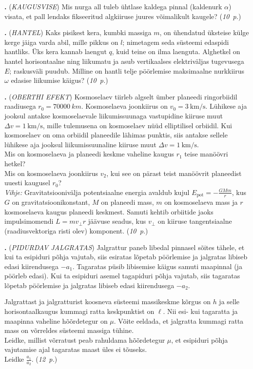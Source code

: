\documentclass[11pt,a5paper]{article}
\newcommand{\numb}[1]{\vspace{5pt}\textbf{\large #1}}
\newcommand{\nimi}[1]{(\textsl{\small #1})}
\newcommand{\punktid}[1]{(\emph{#1~p.})}
\newcounter{ylesanne}
\newcommand{\yl}[1]{\addtocounter{ylesanne}{1}\numb{\theylesanne.} \nimi{#1} \newblock{}}
\newcommand{\autor}[1]{}%
\begin{document}
\newpage
\yl{KAUGUSVISE} Mis nurga all tuleb ühtlase kaldega pinnal (kaldenurk $\alpha$) visata, et pall lendaks fikseeritud algkiiruse juures võimalikult kaugele?
\punktid{10} \autor{Jaan Kalda}

\yl{HANTEL} Kaks pisikest kera, kumbki massiga $m$, on ühendatud üksteise külge kerge jäiga varda abil, mille pikkus on $l$; nimetagem seda süsteemi edaspidi hantliks. Üks kera kannab laengut $q$, kuid teine on ilma laenguta. Alghetkel on hantel horisontaalne ning liikumatu ja asub vertikaalses elektriväljas tugevusega $E$; raskusväli puudub. Milline on hantli telje pöörlemise maksimaalne nurkkiirus $\omega$ edasise liikumise käigus?
\punktid{10} \autor{Jaan Kalda}

\yl{OBERTHI EFEKT} Kosmoselaev tiirleb algselt ümber planeedi ringorbiidil raadiusega $r_0=\SI{70000}{km}$. Kosmoselaeva joonkiirus on $v_0=\SI{3}{\km\per\s}$. Lühikese aja jooksul antakse kosmoselaevale liikumissuunaga vastupidine kiiruse muut $\Delta v=\SI{1}{\km\per\s}$, mille tulemusena on kosmoselaev nüüd elliptilisel orbiidil. Kui kosmoselaev on oma orbiidil planeedile lähimas punktis, siis antakse sellele lühikese aja jooksul liikumissuunaline kiiruse muut $\Delta v=\SI{1}{\km\per\s}$.\\
\osa Mis on kosmoselaeva ja planeedi keskme vaheline kaugus $r_1$ teise manöövri hetkel?\\
\osa Mis on kosmoselaeva joonkiirus $v_2$, kui see on pärast teist manöövrit planeedist uuesti kaugusel $r_0$?\\
\emph{Vihje:} Gravitatsioonivälja potentsiaalne energia avaldub kujul $E_\text{pot} = -\frac{GMm}{r}$, kus $G$ on gravitatsioonikonstant, $M$ on planeedi mass, $m$ on kosmoselaeva mass ja $r$ kosmoselaeva kaugus planeedi keskmest. Samuti kehtib orbiitide jaoks impulsimomendi $L=mv_\perp r$ jäävuse seadus, kus $v_\perp$ on kiiruse tangentsiaalne (raadiusvektoriga risti olev) komponent.
\punktid{10} \autor{Eero Vaher}

\yl{PIDURDAV JALGRATAS}
Jalgrattur paneb libedal pinnasel sõites tähele, et kui ta esipiduri põhja vajutab, siis esiratas lõpetab pöörlemise ja jalgratas libiseb edasi kiirendusega $-a_1$. Tagaratas püsib libisemise käigus samuti maapinnal (ja pöörleb edasi). Kui ta esipiduri asemel tagapiduri põhja vajutab, siis tagaratas lõpetab pöörlemise ja jalgratas libiseb edasi kiirendusega $-a_2$.

Jalgrattast ja jalgratturist koosneva süsteemi massikeskme kõrgus on $h$ ja selle horisontaalkaugus kummagi ratta keskpunktist on $\ell$. Nii esi- kui tagaratta ja maapinna vaheline hõõrdetegur on $\mu$. Võite eeldada, et jalgratta kummagi ratta mass on võrreldes süsteemi massiga tühine.\\
\osa Leidke, millist võrratust peab rahuldama hõõrdetegur $\mu$, et esipiduri põhja vajutamise ajal tagaratas maast üles ei tõuseks.\\
\osa Leidke $\frac{a_1}{a_2}$.
\punktid{12} \autor{Kaarel Hänni}
\end{document}
